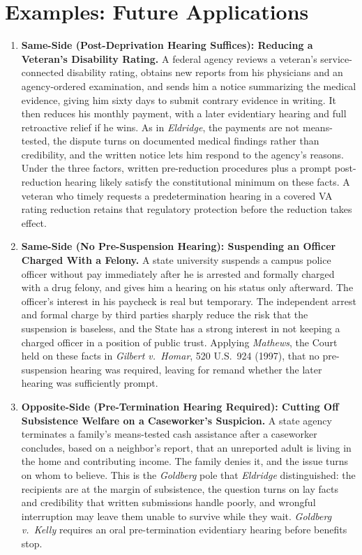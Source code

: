 \documentclass[12pt]{article}
\begin{document}
\section{Examples: Future Applications}
\begin{enumerate}

\item \textbf{Same-Side (Post-Deprivation Hearing Suffices): Reducing a Veteran's Disability Rating.} A federal agency reviews a veteran's service-connected disability rating, obtains new reports from his physicians and an agency-ordered examination, and sends him a notice summarizing the medical evidence, giving him sixty days to submit contrary evidence in writing. It then reduces his monthly payment, with a later evidentiary hearing and full retroactive relief if he wins. As in \textit{Eldridge}, the payments are not means-tested, the dispute turns on documented medical findings rather than credibility, and the written notice lets him respond to the agency's reasons. Under the three factors, written pre-reduction procedures plus a prompt post-reduction hearing likely satisfy the constitutional minimum on these facts. A veteran who timely requests a predetermination hearing in a covered VA rating reduction retains that regulatory protection before the reduction takes effect.

\item \textbf{Same-Side (No Pre-Suspension Hearing): Suspending an Officer Charged With a Felony.} A state university suspends a campus police officer without pay immediately after he is arrested and formally charged with a drug felony, and gives him a hearing on his status only afterward. The officer's interest in his paycheck is real but temporary. The independent arrest and formal charge by third parties sharply reduce the risk that the suspension is baseless, and the State has a strong interest in not keeping a charged officer in a position of public trust. Applying \textit{Mathews}, the Court held on these facts in \textit{Gilbert v.\ Homar}, 520 U.S.\ 924 (1997), that no pre-suspension hearing was required, leaving for remand whether the later hearing was sufficiently prompt.

\item \textbf{Opposite-Side (Pre-Termination Hearing Required): Cutting Off Subsistence Welfare on a Caseworker's Suspicion.} A state agency terminates a family's means-tested cash assistance after a caseworker concludes, based on a neighbor's report, that an unreported adult is living in the home and contributing income. The family denies it, and the issue turns on whom to believe. This is the \textit{Goldberg} pole that \textit{Eldridge} distinguished: the recipients are at the margin of subsistence, the question turns on lay facts and credibility that written submissions handle poorly, and wrongful interruption may leave them unable to survive while they wait. \textit{Goldberg v.\ Kelly} requires an oral pre-termination evidentiary hearing before benefits stop.


\end{enumerate}
\end{document}
